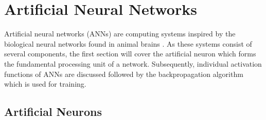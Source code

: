 \section{Artificial Neural Networks}
Artificial neural networks (ANNs) are computing systems inspired by the biological neural networks found in animal brains \cite{Haykin:1998:NNC:521706}. As these systems consist of several components, the first section will cover the artificial neuron which forms the fundamental processing unit of a network. Subsequently, individual activation functions of ANNs are discussed followed by the backpropagation algorithm which is used for training.

\subsection{Artificial Neurons}

